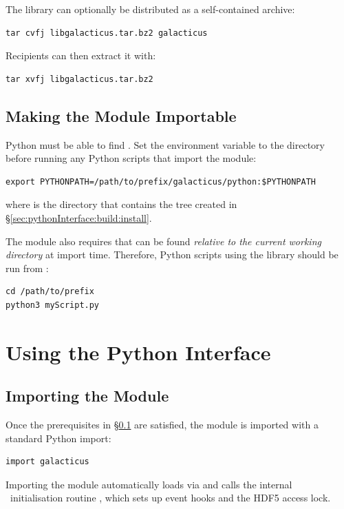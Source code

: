 The library can optionally be distributed as a self-contained archive:
\begin{verbatim}
tar cvfj libgalacticus.tar.bz2 galacticus
\end{verbatim}
Recipients can then extract it with:
\begin{verbatim}
tar xvfj libgalacticus.tar.bz2
\end{verbatim}

\subsection{Making the Module Importable}\label{sec:pythonInterface:build:pythonpath}

Python must be able to find . Set the  environment variable to the  directory before running any Python scripts that import the module:
\begin{verbatim}
export PYTHONPATH=/path/to/prefix/galacticus/python:$PYTHONPATH
\end{verbatim}
where  is the directory that contains the  tree created in \S\ref{sec:pythonInterface:build:install}.

The module also requires that  can be found \emph{relative to the current working directory} at import time. Therefore, Python scripts using the library should be run from :
\begin{verbatim}
cd /path/to/prefix
python3 myScript.py
\end{verbatim}

\section{Using the Python Interface}\label{sec:pythonInterface:usage}

\subsection{Importing the Module}\label{sec:pythonInterface:usage:import}

Once the prerequisites in \S\ref{sec:pythonInterface:build:pythonpath} are satisfied, the module is imported with a standard Python import:
\begin{verbatim}
import galacticus
\end{verbatim}
Importing the module automatically loads  via  and calls the internal \glc\ initialisation routine , which sets up event hooks and the HDF5 access lock.

